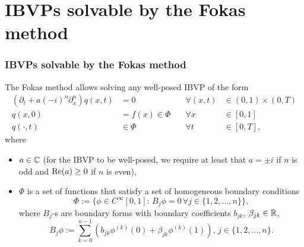 \documentclass{beamer}
\begin{document}
\section{IBVPs solvable by the Fokas method}
\begin{frame}[t]
    \frametitle{IBVPs solvable by the Fokas method}
    The Fokas method allows solving any well-posed IBVP of the form
    \begin{subequations}\label{eq:IBVP}
        \begin{alignat}{3}
            \left(\partial_t + a(-i)^n \partial_x^n\right)q(x,t) &= 0\quad &\forall (x,t)&\in (0,1)\times (0,T) \\
            q(x,0) &= f(x)\in \Phi\quad &\forall x&\in [0,1]\\
            q(\cdot, t) &\in \Phi \quad &\forall t&\in [0,T],
        \end{alignat}
    \end{subequations}
    where
    \begin{itemize}
        \item $a\in\mathbb C$ (for the IBVP to be well-posed, we require at least that $a=\pm i$ if $n$ is odd and $\mathrm{Re}(a)\geq 0$ if $n$ is even),
        \item $\Phi$ is a set of functions that satisfy a set of homogeneous boundary conditions \begin{equation*}%
            \Phi:=\{\phi\in C^\infty[0,1]:\, B_j\phi = 0\,\forall j\in\{1,2,\ldots,n\}\},
        \end{equation*} 
        where $B_j$-s are boundary forms with boundary coefficients $b_{jk}$, $\beta_{jk}\in\mathbb R$,
        \begin{equation*}%
            B_j\phi := \sum_{k=0}^{n-1}\left(b_{jk}\phi^{(k)}(0) + \beta_{jk}\phi^{(k)}(1)\right),\, j\in\{1,2,\ldots,n\}.
        \end{equation*} 
    \end{itemize}
\end{frame}
\end{document}
